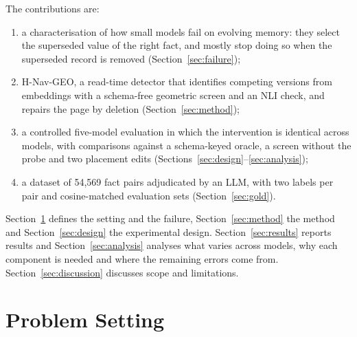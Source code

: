 \documentclass[11pt]{article}
\newcommand{\geo}{H-Nav-GEO}
\begin{document}
The contributions are:
\begin{enumerate}
  \item a characterisation of how small models fail on evolving memory: they select the superseded value of the right fact, and mostly stop doing so when the superseded record is removed (Section~\ref{sec:failure});
  \item \geo{}, a read-time detector that identifies competing versions from embeddings with a schema-free geometric screen and an NLI check, and repairs the page by deletion (Section~\ref{sec:method});
  \item a controlled five-model evaluation in which the intervention is identical across models, with comparisons against a schema-keyed oracle, a screen without the probe and two placement edits (Sections~\ref{sec:design}--\ref{sec:analysis});
  \item a dataset of 54,569 fact pairs adjudicated by an LLM, with two labels per pair and cosine-matched evaluation sets (Section~\ref{sec:gold}).
\end{enumerate}

Section~\ref{sec:problem} defines the setting and the failure, Section~\ref{sec:method} the method and Section~\ref{sec:design} the experimental design. Section~\ref{sec:results} reports results and Section~\ref{sec:analysis} analyses what varies across models, why each component is needed and where the remaining errors come from. Section~\ref{sec:discussion} discusses scope and limitations.


\section{Problem Setting}
\label{sec:problem}
\end{document}
